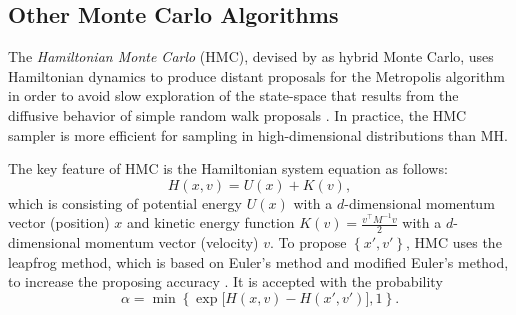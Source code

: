 %
%



\subsection*{Other Monte Carlo Algorithms}

The \textit{Hamiltonian Monte Carlo} (HMC), devised by \cite{duane1987hybrid} as hybrid Monte Carlo, uses Hamiltonian dynamics to produce distant proposals for the Metropolis algorithm in order to avoid slow exploration of the state-space that results from the diffusive behavior of simple random walk proposals \citep{neal2011mcmc}. In practice, the HMC sampler is more efficient for sampling in high-dimensional distributions than MH.

The key feature of HMC is the Hamiltonian system equation as follows: 
\begin{equation}
H(x,v) = U(x)+K(v),
\end{equation}
which is consisting of potential energy $U(x)$ with a $d$-dimensional momentum vector (position) $x$ and kinetic energy function $K(v)=\frac{v^\top M^{-1}v}{2}$ with a $d$-dimensional momentum vector (velocity) $v$. To propose $\left\lbrace x',v'\right\rbrace$, HMC uses the leapfrog method, which is based on Euler's method and modified Euler's method, to increase the proposing accuracy \citep{betancourt2017conceptual}. It is accepted with the probability
\begin{equation}
\alpha = \min\left\lbrace\exp\lbrack H(x,v)-H(x',v') \rbrack, 1\right\rbrace.
\end{equation}

